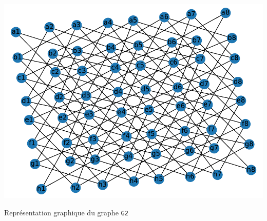 \begin{marginfigure}
		\includegraphics[width=\linewidth]{Graphe_final}
	\caption{Représentation graphique du graphe \texttt{G2}}
\end{marginfigure}

